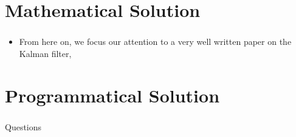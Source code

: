 \section{Mathematical Solution}
\begin{frame}\pw\Large
\frametitle{}
\framesubtitle{}
\begin{itemize}
\item From here on, we focus our attention to a very well written paper on the Kalman filter,  
\end{itemize}
\end{frame}


\section{Programmatical Solution}
\begin{frame}\pw\Large
\frametitle{}
\framesubtitle{}
\end{frame}


\appendix
\begin{frame}\pw\Large
\frametitle{}
\framesubtitle{}
Questions
\end{frame}


